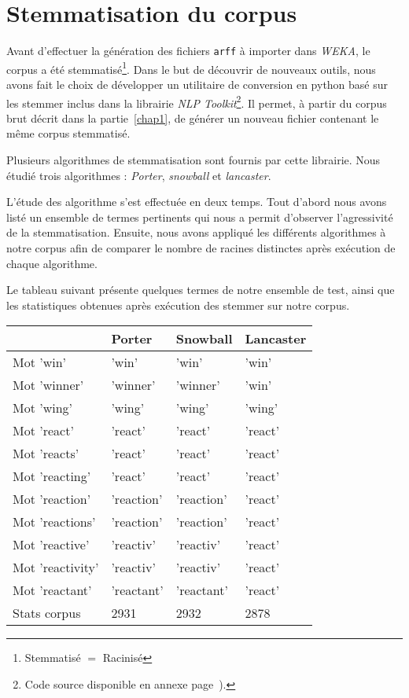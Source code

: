 \section{Stemmatisation du corpus}
Avant d'effectuer la génération des fichiers \texttt{arff} à importer dans \textit{WEKA}, le corpus a été stemmatisé\footnote{Stemmatisé $=$ Racinisé}. Dans le but de découvrir de nouveaux outils, nous avons fait le choix de développer un utilitaire de conversion en python basé sur les stemmer inclus dans la librairie \textit{NLP Toolkit}\footnote{Code source disponible en annexe page~\pageref{annexe:stemmer}).}. Il permet, à partir du corpus brut décrit dans la partie~\vref{chap1}, de générer un nouveau fichier contenant le même corpus stemmatisé.

Plusieurs algorithmes de stemmatisation sont fournis par cette librairie. Nous étudié trois algorithmes : \textit{Porter}, \textit{snowball} et \textit{lancaster}.

L'étude des algorithme s'est effectuée en deux temps. Tout d'abord nous avons listé un ensemble de termes pertinents qui nous a permit d'observer l'agressivité de la stemmatisation. Ensuite, nous avons appliqué les différents algorithmes à notre corpus afin de comparer le nombre de racines distinctes après exécution de chaque algorithme.

Le tableau suivant présente quelques termes de notre ensemble de test, ainsi que les statistiques obtenues après exécution des stemmer sur notre corpus.

\begin{tabular}{l l l l}
				& \textbf{Porter}	& \textbf{Snowball}	& \textbf{Lancaster} \\
\hline
Mot 'win'		& 'win'				& 'win'				& 'win' \\
Mot 'winner'	& 'winner'			& 'winner'			& 'win' \\
Mot 'wing'		& 'wing'			& 'wing'			& 'wing' \\
\hline
Mot 'react'		& 'react'			& 'react'			& 'react' \\
Mot 'reacts'	& 'react'			& 'react'			& 'react' \\
Mot 'reacting'	& 'react'			& 'react'			& 'react' \\
Mot 'reaction'	& 'reaction'		& 'reaction'		& 'react' \\
Mot 'reactions'	& 'reaction'		& 'reaction'		& 'react' \\
Mot 'reactive'	& 'reactiv'			& 'reactiv'			& 'react' \\
Mot 'reactivity'& 'reactiv'			& 'reactiv'			& 'react' \\
Mot 'reactant'	& 'reactant'		& 'reactant'		& 'react' \\
\hline
\hline
Stats corpus 	& 2931				& 2932 				& 2878 \\
\end{tabular}

